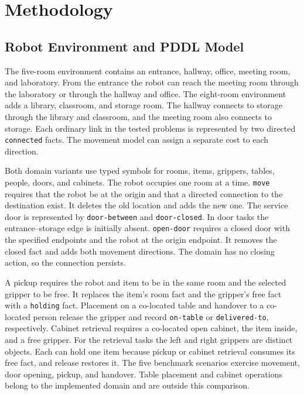 \documentclass[conference,a4paper]{IEEEtran}
\theoremstyle{plain}
\theoremstyle{definition}
\theoremstyle{remark}
\begin{document}
\section{Methodology}
\label{sec:methodology}
\subsection{Robot Environment and PDDL Model}
The five-room environment contains an entrance, hallway, office, meeting room, and laboratory. From the entrance the robot can reach the meeting room through the laboratory or through the hallway and office. The eight-room environment adds a library, classroom, and storage room. The hallway connects to storage through the library and classroom, and the meeting room also connects to storage. Each ordinary link in the tested problems is represented by two directed \texttt{connected} facts. The movement model can assign a separate cost to each direction.

Both domain variants use typed symbols for rooms, items, grippers, tables, people, doors, and cabinets. The robot occupies one room at a time. \texttt{move} requires that the robot be at the origin and that a directed connection to the destination exist. It deletes the old location and adds the new one. The service door is represented by \texttt{door-between} and \texttt{door-closed}. In door tasks the entrance--storage edge is initially absent. \texttt{open-door} requires a closed door with the specified endpoints and the robot at the origin endpoint. It removes the closed fact and adds both movement directions. The domain has no closing action, so the connection persists.

A pickup requires the robot and item to be in the same room and the selected gripper to be free. It replaces the item's room fact and the gripper's free fact with a \texttt{holding} fact. Placement on a co-located table and handover to a co-located person release the gripper and record \texttt{on-table} or \texttt{delivered-to}, respectively. Cabinet retrieval requires a co-located open cabinet, the item inside, and a free gripper. For the retrieval tasks the left and right grippers are distinct objects. Each can hold one item because pickup or cabinet retrieval consumes its free fact, and release restores it. The five benchmark scenarios exercise movement, door opening, pickup, and handover. Table placement and cabinet operations belong to the implemented domain and are outside this comparison.
\end{document}
